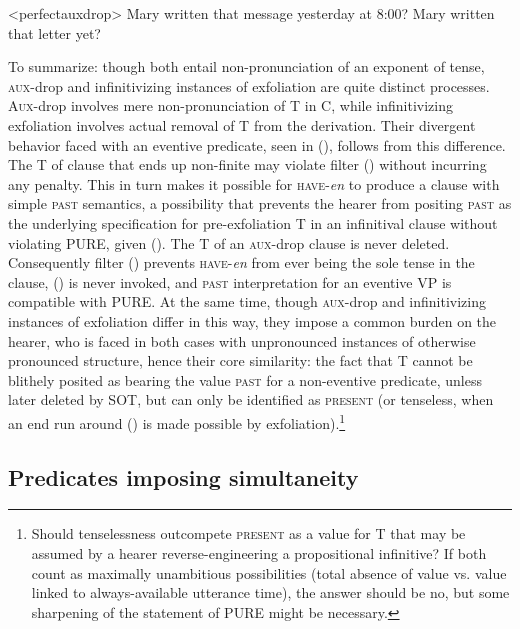 \documentclass[output=paper]{langscibook}
\begin{document}
\pex<perfectauxdrop>
\a \ljudge*Mary written that message yesterday at 8:00?
\a Mary written that letter yet?
\xe

To summarize: though both entail non-pronunciation of an exponent of tense, \textsc{aux-}drop and infinitivizing instances of exfoliation are quite distinct processes. \textsc{Aux-}drop involves mere non-pronunciation of T in C, while infinitivizing exfoliation involves actual removal of T from the derivation. Their divergent behavior faced with an eventive predicate, seen in (), follows from this difference. The T of clause that ends up non-finite may violate filter () without incurring any penalty. This in turn makes it possible for \textsc{have-}\textit{en} to produce a clause with simple \textsc{past} semantics, a possibility that prevents the hearer from positing \textsc{past} as the underlying specification for pre-exfoliation T in an infinitival clause without violating PURE, given (). The T of an \textsc{aux-}drop clause is never deleted. Consequently filter () prevents \textsc{have-}\textit{en} from ever being the sole tense in the clause, () is never invoked, and \textsc{past} interpretation for an eventive VP is compatible with PURE. At the same time, though \textsc{aux-}drop and infinitivizing instances of exfoliation differ in this way, they impose a common burden on the hearer, who is faced in both cases with unpronounced instances of otherwise pronounced structure, hence their core similarity: the fact that \textsc{T} cannot be blithely posited as bearing the value \textsc{past} for a non-eventive predicate, unless later deleted by SOT, but can only be identified as \textsc{present} (or tenseless, when an end run around () is made possible by exfoliation).\footnote{Should tenselessness outcompete \textsc{present} as a value for T that may be assumed by a hearer reverse-engineering a propositional infinitive? If both count as maximally unambitious possibilities (total absence of value vs. value linked to always-available utterance time), the answer should be no, but some sharpening of the statement of PURE might be necessary.}

\subsection{Predicates imposing simultaneity}
\end{document}
